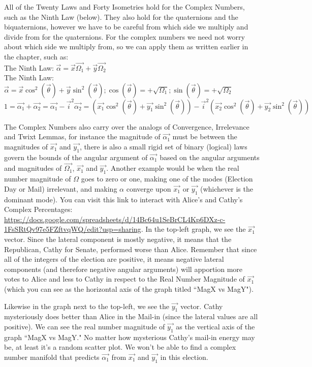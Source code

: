 \documentclass[preprint,13pt]{elsarticle}
\begin{document}
All of the Twenty Laws and Forty Isometries hold for the Complex Numbers, such as the Ninth Law (below). They also hold for the quaternions and the biquaternions, however we have to be careful from which side we multiply and divide from for the quaternions. For the complex numbers we need not worry about which side we multiply from, so we can apply them as written earlier in the chapter, such as:\\
The Ninth Law: $\vec{\alpha}=\vec{x}\vec{\Omega_{1}}+\vec{y}\vec{\Omega_{2}}$\\
The Ninth Law: $\vec{\alpha}=\vec{x}\cos^{2}( \vec\theta )+\vec{y}\sin^{2}( \vec\theta ); \cos(\vec{\theta})=+\sqrt{\Omega_{1}}; \sin(\vec{\theta})=+\sqrt{\Omega_{2}}$
$$1=\vec{\alpha_{1}}+\vec{\alpha_{2}}=\vec{\alpha_{1}}-\vec{i}^2\vec{\alpha_{2}}=\left(\vec{x_{1}}\cos^{2}( \vec\theta )+\vec{y_{1}}\sin^{2}( \vec\theta )\right)-\vec{i}^2\left(\vec{x_{2}}\cos^{2}( \vec\theta )+\vec{y_{2}}\sin^{2}( \vec\theta )\right)$$

The Complex Numbers also carry over the analogs of Convergence, Irrelevance and Twixt Lemmas, for instance the magnitude of $\vec{\alpha_{1}}$ must be between the magnitudes of $\vec{x_{1}}$ and $\vec{y_{1}}$, there is also a small rigid set of binary (logical) laws govern the bounds of the angular argument of $\vec{\alpha_{1}}$ based on the angular arguments and magnitudes of $\vec{\Omega_{1}}$, $\vec{x_{1}}$ and $\vec{y_{1}}$. Another example would be when the real number magnitude of $\Omega$ goes to zero or one, making one of the modes (Election Day or Mail) irrelevant, and making $\alpha$ converge upon $\vec{x_{1}}$ or $\vec{y_{1}}$ (whichever is the dominant mode).
\newpage
You can visit this link to interact with Alice's and Cathy's Complex Percentages: \url{https://docs.google.com/spreadsheets/d/14Bc64u1SeBrCL4Kp6DXz-c-1FsSRtQv97e5FZftvqWQ/edit?usp=sharing}. In the top-left graph, we see the $\vec{x_{1}}$ vector. Since the lateral component is mostly negative, it means that the Republican, Cathy for Senate, performed worse than Alice. Remember that since all of the integers of the election are positive, it means negative lateral components (and therefore negative angular arguments) will apportion more votes to Alice and less to Cathy in respect to the Real Number Magnitude of $\vec{x_{1}}$ (which you can see as the horizontal axis of the graph titled ``MagX vs MagY").

Likewise in the graph next to the top-left, we see the $\vec{y_{1}}$ vector. Cathy mysteriously does better than Alice in the Mail-in (since the lateral values are all positive). We can see the real number magnitude of $\vec{y_{1}}$ as the vertical axis of the graph ``MagX vs MagY." No matter how mysterious Cathy's mail-in energy may be, at least it's a random scatter plot. We won't be able to find a complex number manifold that predicts $\vec{\alpha_{1}}$ from $\vec{x_{1}}$ and $\vec{y_{1}}$ in this election.
\end{document}
